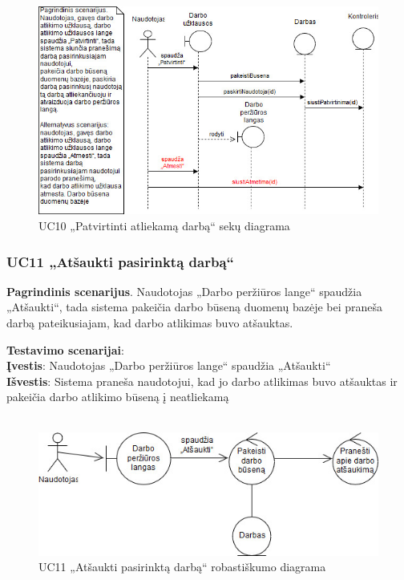 \documentclass{VUMIFPSbakalaurinis}
\begin{document}
\begin{figure}[H]
	\centering
	\includegraphics[scale=0.6]{img/Sequence/10sequence}
	\caption{UC10 „Patvirtinti atliekamą darbą“ sekų diagrama}
	\label{img:uc10seq}
\end{figure}

\subsubsection{UC11 „Atšaukti pasirinktą darbą“}
\textbf{Pagrindinis scenarijus}. Naudotojas „Darbo peržiūros lange“ spaudžia „Atšaukti“, tada sistema pakeičia darbo būseną duomenų bazėje bei praneša darbą pateikusiajam, kad darbo atlikimas buvo atšauktas.
\par \textbf{Testavimo scenarijai}:\\
\textbf{Įvestis}: Naudotojas „Darbo peržiūros lange“ spaudžia „Atšaukti“\\
\textbf{Išvestis}: Sistema praneša naudotojui, kad jo darbo atlikimas buvo atšauktas ir pakeičia darbo atlikimo būseną į neatliekamą\\ \\


\begin{figure}[H]
	\centering
	\includegraphics[scale=0.6]{img/Robustness/UC11}
	\caption{UC11 „Atšaukti pasirinktą darbą“ robastiškumo diagrama}
	\label{img:uc11rob}
\end{figure}
\end{document}
